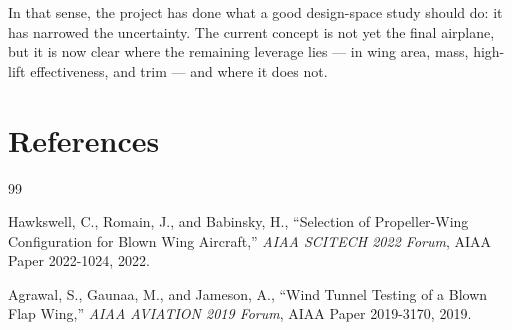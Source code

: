 \documentclass[conf]{new-aiaa}
\begin{document}
In that sense, the project has done what a good design-space study should do: it has narrowed the uncertainty. The current concept is not yet the final airplane, but it is now clear where the remaining leverage lies --- in wing area, mass, high-lift effectiveness, and trim --- and where it does not.

\section*{References}
\begin{thebibliography}{99}

Hawkswell, C., Romain, J., and Babinsky, H.,
``Selection of Propeller-Wing Configuration for Blown Wing Aircraft,''
\emph{AIAA SCITECH 2022 Forum},
AIAA Paper 2022-1024,
2022.

Agrawal, S., Gaunaa, M., and Jameson, A.,
``Wind Tunnel Testing of a Blown Flap Wing,''
\emph{AIAA AVIATION 2019 Forum},
AIAA Paper 2019-3170,
2019.

\end{thebibliography}
\end{document}
